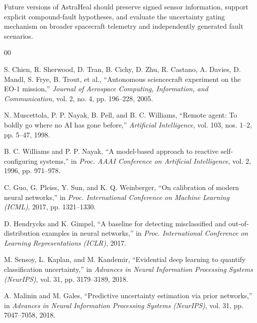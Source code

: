 \documentclass[conference]{IEEEtran}
\begin{document}
Future versions of AstraHeal should preserve signed sensor information,
support explicit compound-fault hypotheses, and evaluate the uncertainty
gating mechanism on broader spacecraft telemetry and independently generated
fault scenarios.

\begin{thebibliography}{00}

S. Chien, R. Sherwood, D. Tran, B. Cichy, D. Zhu, R. Castano, A. Davies,
D. Mandl, S. Frye, B. Trout, et al.,
``Autonomous sciencecraft experiment on the EO-1 mission,''
\emph{Journal of Aerospace Computing, Information, and Communication},
vol. 2, no. 4, pp. 196--228, 2005.

N. Muscettola, P. P. Nayak, B. Pell, and B. C. Williams,
``Remote agent: To boldly go where no AI has gone before,''
\emph{Artificial Intelligence}, vol. 103, nos. 1--2, pp. 5--47, 1998.

B. C. Williams and P. P. Nayak,
``A model-based approach to reactive self-configuring systems,''
in \emph{Proc. AAAI Conference on Artificial Intelligence},
vol. 2, 1996, pp. 971--978.

C. Guo, G. Pleiss, Y. Sun, and K. Q. Weinberger,
``On calibration of modern neural networks,''
in \emph{Proc. International Conference on Machine Learning (ICML)},
2017, pp. 1321--1330.

D. Hendrycks and K. Gimpel,
``A baseline for detecting misclassified and out-of-distribution examples
in neural networks,''
in \emph{Proc. International Conference on Learning Representations (ICLR)},
2017.

M. Sensoy, L. Kaplan, and M. Kandemir,
``Evidential deep learning to quantify classification uncertainty,''
in \emph{Advances in Neural Information Processing Systems (NeurIPS)},
vol. 31, pp. 3179--3189, 2018.

A. Malinin and M. Gales,
``Predictive uncertainty estimation via prior networks,''
in \emph{Advances in Neural Information Processing Systems (NeurIPS)},
vol. 31, pp. 7047--7058, 2018.

\end{thebibliography}
\end{document}
